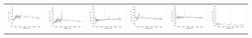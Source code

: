 \begin{center}
\begin{longtable}{l l l l l l }
    \includegraphics[width=0.3\linewidth, clip]{Figs/Figs-sdss/spec-4194-55450-0940-STRIPE82-0120-007072.pdf} & \includegraphics[width=0.3\linewidth, clip]{Figs/Figs-sdss/spec-4197-55479-0626-STRIPE82-0126-031903.pdf} & \includegraphics[width=0.3\linewidth, clip]{Figs/Figs-sdss/spec-4200-55499-0994-STRIPE82-0136-009636.pdf} & \includegraphics[width=0.3\linewidth, clip]{Figs/Figs-sdss/spec-4202-55445-0409-SPLUS-s02s09-042917.pdf} & \includegraphics[width=0.3\linewidth, clip]{Figs/Figs-sdss/spec-4204-55470-0588-STRIPE82-0142-034401.pdf} & \includegraphics[width=0.3\linewidth, clip]{Figs/Figs-sdss/spec-4205-55454-0490-STRIPE82-0143-027848.pdf} \\

\end{longtable}
\end{center}
